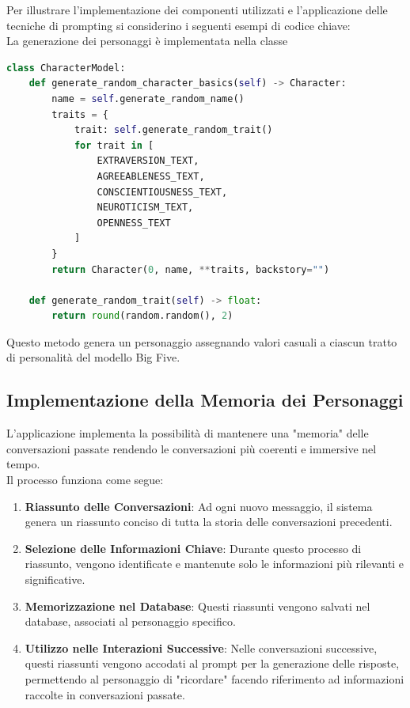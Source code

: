 Per illustrare l'implementazione dei componenti utilizzati e l'applicazione delle tecniche di prompting si considerino i seguenti esempi di codice chiave:\\
La generazione dei personaggi è implementata nella classe
\begin{lstlisting}[language=Python]
class CharacterModel:
    def generate_random_character_basics(self) -> Character:
        name = self.generate_random_name()
        traits = {
            trait: self.generate_random_trait() 
            for trait in [
                EXTRAVERSION_TEXT, 
                AGREEABLENESS_TEXT, 
                CONSCIENTIOUSNESS_TEXT, 
                NEUROTICISM_TEXT, 
                OPENNESS_TEXT
            ]
        }
        return Character(0, name, **traits, backstory="")

    def generate_random_trait(self) -> float:
        return round(random.random(), 2)
\end{lstlisting}
Questo metodo genera un personaggio assegnando valori casuali a ciascun tratto di personalità del modello Big Five.

\clearpage

\subsection{Implementazione della Memoria dei Personaggi}

L'applicazione implementa la possibilità di mantenere una "memoria" delle conversazioni passate rendendo le conversazioni più coerenti e immersive nel tempo.\\
Il processo funziona come segue:

\begin{enumerate}
    \item
    \textbf{Riassunto delle Conversazioni}:
    Ad ogni nuovo messaggio, il sistema genera un riassunto conciso di tutta la storia delle conversazioni precedenti.
    \item
    \textbf{Selezione delle Informazioni Chiave}:
    Durante questo processo di riassunto, vengono identificate e mantenute solo le informazioni più rilevanti e significative.
    \item
    \textbf{Memorizzazione nel Database}:
    Questi riassunti vengono salvati nel database, associati al personaggio specifico.
    \item
    \textbf{Utilizzo nelle Interazioni Successive}:
    Nelle conversazioni successive, questi riassunti vengono accodati al prompt per la generazione delle risposte, permettendo al personaggio di "ricordare" facendo riferimento ad informazioni raccolte in conversazioni passate.
\end{enumerate}

